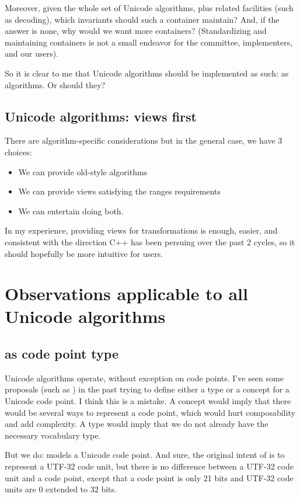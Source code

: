 \documentclass{wg21}
\begin{document}
Moreover, given the whole set of Unicode algorithms, plus related facilities (such as decoding), which invariants should such a container maintain?
And, if the answer is none, why would we want more containers? (Standardizing and maintaining containers is not a small endeavor for the committee, implementers, and our users).

So it is clear to me that Unicode algorithms should be implemented as such: as algorithms.
Or should they?

\subsection{Unicode algorithms: views first}

There are algorithm-specific considerations but in the general case, we have 3 choices:

\begin{itemize}
    \item We can provide old-style algorithms
    \item We can provide views satisfying the ranges requirements
    \item We can entertain doing both.
\end{itemize}

In my experience, providing views for transformations is enough, easier, and consistent with the direction C++ has been persuing over the past 2 cycles, so it should hopefully be more intuitive for users.

\section{Observations applicable to all Unicode algorithms}

\subsection{ as code point type}

Unicode algorithms operate, without exception on code points.
I've seen some proposals (such as ) in the past trying to define either a type or a concept for a Unicode code point.
I think this is a mistake. A concept would imply that there would be several ways to represent a code point, which would hurt composability and add complexity.
A type would imply that we do not already have the necessary vocabulary type.

But we do:  models a Unicode code point. And sure, the original intent of  is to represent a UTF-32 code unit, but there is no
difference between a UTF-32 code unit and a code point, except that a code point is only 21 bits and UTF-32 code units are 0 extended to 32 bits.
\end{document}
